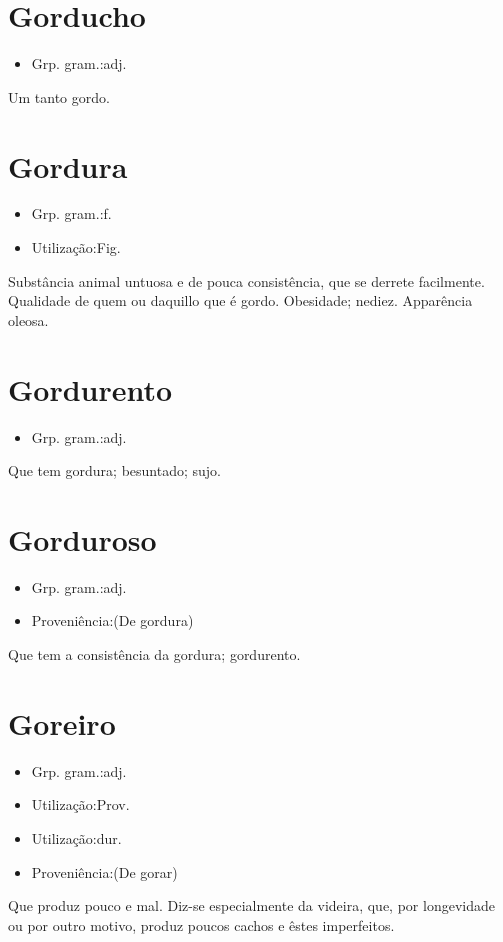 \section{Gorducho}
\begin{itemize}
\item {Grp. gram.:adj.}
\end{itemize}
Um tanto gordo.
\section{Gordura}
\begin{itemize}
\item {Grp. gram.:f.}
\end{itemize}
\begin{itemize}
\item {Utilização:Fig.}
\end{itemize}
Substância animal untuosa e de pouca consistência, que se derrete facilmente.
Qualidade de quem ou daquillo que é gordo.
Obesidade; nediez.
Apparência oleosa.
\section{Gordurento}
\begin{itemize}
\item {Grp. gram.:adj.}
\end{itemize}
Que tem gordura; besuntado; sujo.
\section{Gorduroso}
\begin{itemize}
\item {Grp. gram.:adj.}
\end{itemize}
\begin{itemize}
\item {Proveniência:(De \textunderscore gordura\textunderscore )}
\end{itemize}
Que tem a consistência da gordura; gordurento.
\section{Goreiro}
\begin{itemize}
\item {Grp. gram.:adj.}
\end{itemize}
\begin{itemize}
\item {Utilização:Prov.}
\end{itemize}
\begin{itemize}
\item {Utilização:dur.}
\end{itemize}
\begin{itemize}
\item {Proveniência:(De \textunderscore gorar\textunderscore )}
\end{itemize}
Que produz pouco e mal.
Diz-se especialmente da videira, que, por longevidade ou por outro motivo, produz poucos cachos e êstes imperfeitos.
